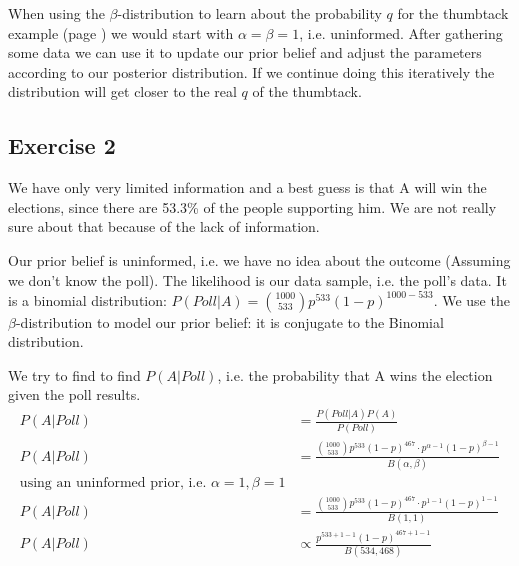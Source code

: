 \bigskip

When using the $\beta$-distribution to learn about the probability $q$ for the thumbtack example (page \pageref{example:Thumbtack Toss}) we would start with $\alpha=\beta=1$, i.e. uninformed. After gathering some data we can use it to update our prior belief and adjust the parameters according to our posterior distribution. If we continue doing this iteratively the distribution will get closer to the real $q$ of the thumbtack. %


\subsection*{Exercise 2}
We have only very limited information and a best guess is that A will win the elections, since there are 53.3\% of the people supporting him. We are not really sure about that because of the lack of information.

Our prior belief is uninformed, i.e. we have no idea about the outcome (Assuming we don't know the poll). The likelihood is our data sample, i.e. the poll's data. It is a binomial distribution: $P(Poll|A) = \binom{1000}{533} p^{533}(1-p)^{1000-533}$. We use the $\beta$-distribution to model our prior belief: it is conjugate to the Binomial distribution. 

We try to find to find $P(A|Poll)$, i.e. the probability that A wins the election given the poll results.
\begin{align*}
P(A|Poll) &= \frac{P(Poll|A)P(A)}{P(Poll)}\\
P(A|Poll) &= \frac{\binom{1000}{533}p^{533}(1-p)^{467} \cdot p^{\alpha-1}(1-p)^{\beta-1}}{B(\alpha,\beta)}\\
\text{using an uninformed prior, i.e. }\alpha=1, \beta=1\\
P(A|Poll) &= \frac{\binom{1000}{533}p^{533}(1-p)^{467} \cdot p^{1-1}(1-p)^{1-1}}{B(1,1)}\\
P(A|Poll) &\propto \frac{p^{533+1-1}(1-p)^{467+1-1}}{B(534,468)}
\end{align*}

